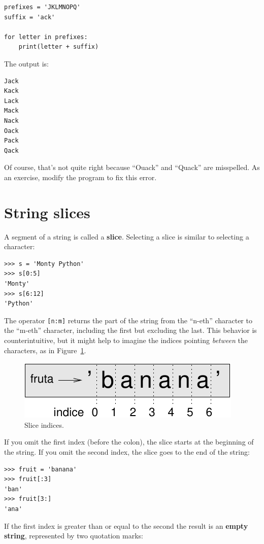 \documentclass[10pt]{book}
\begin{document}
\begin{verbatim}
prefixes = 'JKLMNOPQ'
suffix = 'ack'

for letter in prefixes:
    print(letter + suffix)
\end{verbatim}
%
The output is:

\begin{verbatim}
Jack
Kack
Lack
Mack
Nack
Oack
Pack
Qack
\end{verbatim}
%
Of course, that's not quite right because ``Ouack'' and ``Quack'' are
misspelled.  As an exercise, modify the program to fix this error.



\section{String slices}
\label{slice}
  
 

A segment of a string is called a {\bf slice}.  Selecting a slice is
similar to selecting a character:

\begin{verbatim}
>>> s = 'Monty Python'
>>> s[0:5]
'Monty'
>>> s[6:12]
'Python'
\end{verbatim}
%
The operator {\tt [n:m]} returns the part of the string from the
``n-eth'' character to the ``m-eth'' character, including the first but
excluding the last.  This behavior is counterintuitive, but it might
help to imagine the indices pointing {\em between} the
characters, as in Figure~\ref{fig.banana}.

\begin{figure}
\centerline
{\includegraphics[scale=0.8]{figs/banana.pdf}}
\caption{Slice indices.}
\label{fig.banana}
\end{figure}

If you omit the first index (before the colon), the slice starts at
the beginning of the string.  If you omit the second index, the slice
goes to the end of the string:

\begin{verbatim}
>>> fruit = 'banana'
>>> fruit[:3]
'ban'
>>> fruit[3:]
'ana'
\end{verbatim}
%
If the first index is greater than or equal to the second the result
is an {\bf empty string}, represented by two quotation marks:
\end{document}
